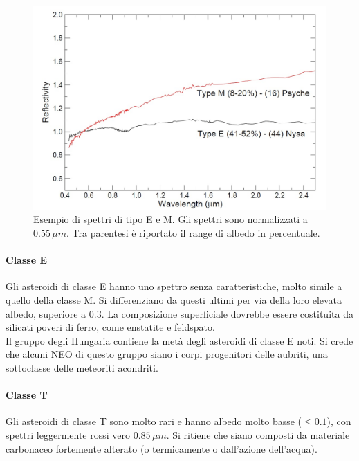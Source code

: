 \documentclass[a4paper,11pt,openright]{book}
\begin{document}
\begin{figure}[h]
    \centering
    \includegraphics[scale=0.3]{figure/spettro_em.jpg}
    \caption[Esempio di spettri di tipo E e M.]{Esempio di spettri di tipo E e M. Gli spettri sono normalizzati a $0.55\,\mu m$. Tra parentesi è riportato il range di albedo in percentuale. \citep{magrin_spectroscopic_nodate}}
    \label{spettro_em}
\end{figure}

\paragraph*{Classe E}
Gli asteroidi di classe E hanno uno spettro senza caratteristiche, molto simile a quello della classe M. Si differenziano da questi ultimi per via della loro elevata albedo, superiore a $0.3$. La composizione superficiale dovrebbe essere costituita da silicati poveri di ferro, come enstatite e feldspato.\\
Il gruppo degli Hungaria contiene la metà degli asteroidi di classe E noti. Si crede che alcuni NEO di questo gruppo siano i corpi progenitori delle aubriti, una sottoclasse delle meteoriti acondriti.

\paragraph*{Classe T}
Gli asteroidi di classe T sono molto rari e hanno albedo molto basse ($\leq 0.1$), con spettri leggermente rossi vero $0.85\,\mu m$. Si ritiene che siano composti da materiale carbonaceo fortemente
alterato (o termicamente o dall'azione dell'acqua).
\end{document}
